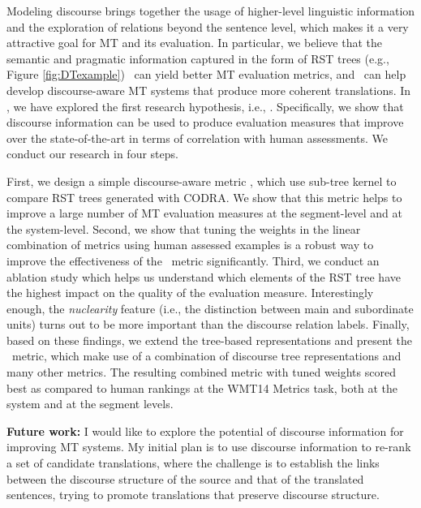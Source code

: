 \documentclass{article} %
\begin{document}
Modeling discourse brings together the usage of higher-level linguistic information and the exploration of relations beyond the sentence level, which makes it a very attractive goal for MT and its evaluation. In particular, we believe that the semantic and pragmatic information captured in the form of RST trees (e.g., Figure \ref{fig:DTexample}) \Ni\ can yield better MT evaluation metrics, and \Nii\ can help develop discourse-aware MT systems that produce more coherent translations. In \cite{Shafiq_discoMT16,guzman-EtAl:ACL2014}, we have explored the first research hypothesis, i.e., \Ni. Specifically, we show that discourse information can be used to produce evaluation measures  that improve over the state-of-the-art in terms of correlation with human assessments. We conduct our research in four steps. 

First, we design a simple discourse-aware metric \qcril, which use sub-tree kernel to compare RST trees generated with CODRA. We show that this metric helps to improve a large number of MT evaluation measures at the segment-level and at the system-level. Second, we show that tuning the weights in the linear combination of metrics using human assessed examples is a robust way to improve the effectiveness of the \qcril\ metric significantly. Third, we conduct an ablation study which helps us understand which elements of the RST tree have the highest impact on the quality of the evaluation measure. Interestingly enough, the \emph{nuclearity} feature (i.e., the distinction between main and subordinate units) turns out to be more important than the discourse relation labels. Finally, based on these findings, we extend the tree-based representations and present the \discoparty\ metric, which make use of a combination of discourse tree representations and many other metrics. The resulting combined metric with tuned weights scored best as compared to human rankings at the WMT14 Metrics task, both at the system and at the segment levels. %

\textbf{Future work:} I would like to explore the potential of discourse information for improving MT systems. My initial plan is to use discourse information to re-rank a set of candidate translations, where the challenge is to establish the links between the discourse structure of the source and that of the translated sentences, trying to promote translations that preserve discourse structure.
\end{document}
